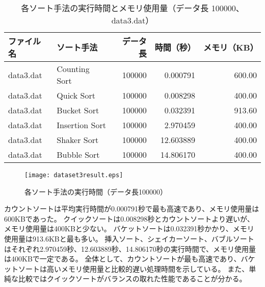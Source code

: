 \documentclass[a4j, 12pt]{jarticle}
\begin{document}
\begin{table}[H]
  \centering
  \caption{各ソート手法の実行時間とメモリ使用量（データ長 100000、data3.dat）}\label{dataset3allresult}
  \begin{tabular}{|l|l|r|r|r|}
    \hline
    \textbf{ファイル名} & \textbf{ソート手法} & \textbf{データ長} & \textbf{時間（秒）} & \textbf{メモリ（KB）} \\
    \hline
    data3.dat & Counting Sort  & 100000 & 0.000791  & 600.00 \\
    data3.dat & Quick Sort     & 100000 & 0.008298  & 400.00 \\
    data3.dat & Bucket Sort    & 100000 & 0.032391  & 913.60 \\
    data3.dat & Insertion Sort & 100000 & 2.970459  & 400.00 \\
    data3.dat & Shaker Sort    & 100000 & 12.603889 & 400.00 \\
    data3.dat & Bubble Sort    & 100000 & 14.806170 & 400.00 \\
    \hline
  \end{tabular}
\end{table}
\begin{figure}[H]
  \centering
  \texttt{[image: dataset3result.eps]}
  \caption{各ソート手法の実行時間（データ長100000）}\label{dataset3allresultgraph}
\end{figure}
カウントソートは平均実行時間が0.000791秒で最も高速であり、メモリ使用量は600KBであった。
クイックソートは0.008298秒とカウントソートより遅いが、メモリ使用量は400KBと少ない。
バケットソートは0.032391秒かかり、メモリ使用量は913.6KBと最も多い。
挿入ソート、シェイカーソート、バブルソートはそれぞれ2.970459秒、12.603889秒、14.806170秒の実行時間で、メモリ使用量は400KBで一定である。
全体として、カウントソートが最も高速であり、バケットソートは高いメモリ使用量と比較的遅い処理時間を示している。
また、単純な比較ではクイックソートがバランスの取れた性能であることが分かる。
\newpage
\end{document}
